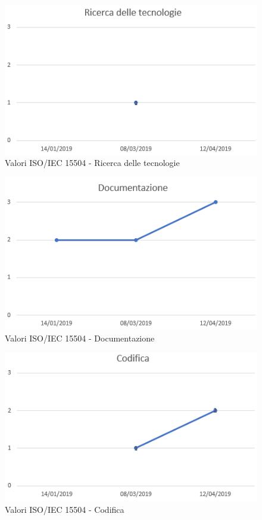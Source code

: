\begin{figure}[H]
	\centering
	\includegraphics[scale=1]{images/resoconto/Ricerca.png}
	\caption{Valori ISO/IEC 15504 - Ricerca delle tecnologie}	
\end{figure}


\begin{figure}[H]
	\centering
	\includegraphics[scale=1]{images/resoconto/Documentazione.png}
	\caption{Valori ISO/IEC 15504 - Documentazione}	
\end{figure}


\begin{figure}[H]
	\centering
	\includegraphics[scale=1]{images/resoconto/Codifica.png}
	\caption{Valori ISO/IEC 15504 - Codifica}	
\end{figure}
\newpage
